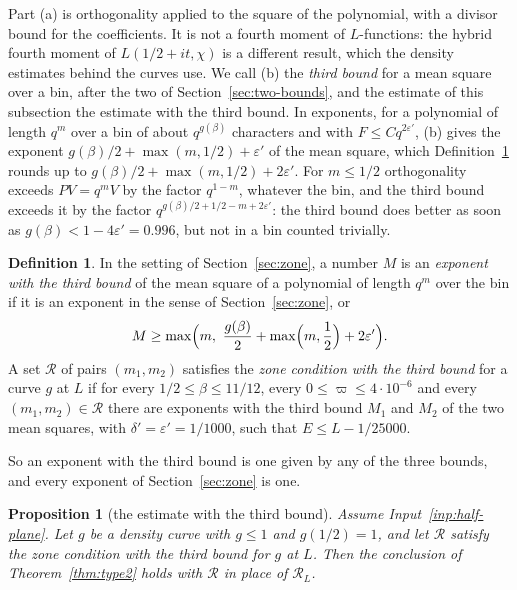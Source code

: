 \documentclass[11pt]{article}
\newtheorem{proposition}[theorem]{Proposition}
\theoremstyle{definition}
\newtheorem{definition}[theorem]{Definition}
\begin{document}
Part (a) is orthogonality applied to the square of the polynomial, with a divisor bound for the coefficients. It is not
a fourth moment of $L$-functions: the hybrid fourth moment of $L(1/2 + it, \chi)$ is a different result, which the
density estimates behind the curves use. We call (b) the \emph{third bound} for a mean square over a bin, after the two
of Section~\ref{sec:two-bounds}, and the estimate of this subsection the estimate with the third bound. In exponents,
for a polynomial of length $q^m$ over a bin of about
$q^{g(\beta)}$ characters and with $F \le C q^{2\varepsilon'}$, (b) gives the exponent $g(\beta)/2 + \max(m, 1/2) +
\varepsilon'$ of the mean square, which Definition~\ref{def:zone4} rounds up to $g(\beta)/2 + \max(m, 1/2) +
2\varepsilon'$. For $m \le 1/2$ orthogonality exceeds $PV = q^m V$ by the factor $q^{1 - m}$, whatever the bin, and the
third bound exceeds it by the factor $q^{g(\beta)/2 + 1/2 - m + 2\varepsilon'}$: the third bound does better as soon
as $g(\beta) < 1 -
4\varepsilon' = 0.996$, but not in a bin counted trivially.

\begin{definition}\label{def:zone4}
In the setting of Section~\ref{sec:zone}, a number $M$ is an \emph{exponent with the third bound} of the mean square of
a polynomial of length $q^m$ over the bin if it is an exponent in the sense of Section~\ref{sec:zone}, or
\[
  M \ge \max\Bigl(m,\ \frac{g(\beta)}2 + \max\Bigl(m, \frac12\Bigr) + 2\varepsilon'\Bigr).
\]
A set $\mathcal R$ of pairs $(m_1, m_2)$ satisfies the \emph{zone condition with the third bound} for a curve $g$ at
$L$ if for every $1/2 \le \beta \le 11/12$, every $0 \le \varpi \le 4 \cdot 10^{-6}$ and every $(m_1, m_2) \in
\mathcal R$ there are exponents with the third bound $M_1$ and $M_2$ of the two mean squares, with $\delta' =
\varepsilon' = 1/1000$, such that $E \le L - 1/25000$.
\end{definition}

So an exponent with the third bound is one given by any of the three bounds, and every exponent of
Section~\ref{sec:zone} is one.

\begin{proposition}[the estimate with the third bound]\label{prop:type2-gen4}
Assume Input~\ref{inp:half-plane}. Let $g$ be a density curve with $g \le 1$ and $g(1/2) = 1$, and let $\mathcal R$
satisfy the zone condition with the third bound for $g$ at $L$. Then the conclusion of Theorem~\ref{thm:type2} holds
with $\mathcal R$ in place of $\mathcal R_L$.
\end{proposition}
\end{document}
